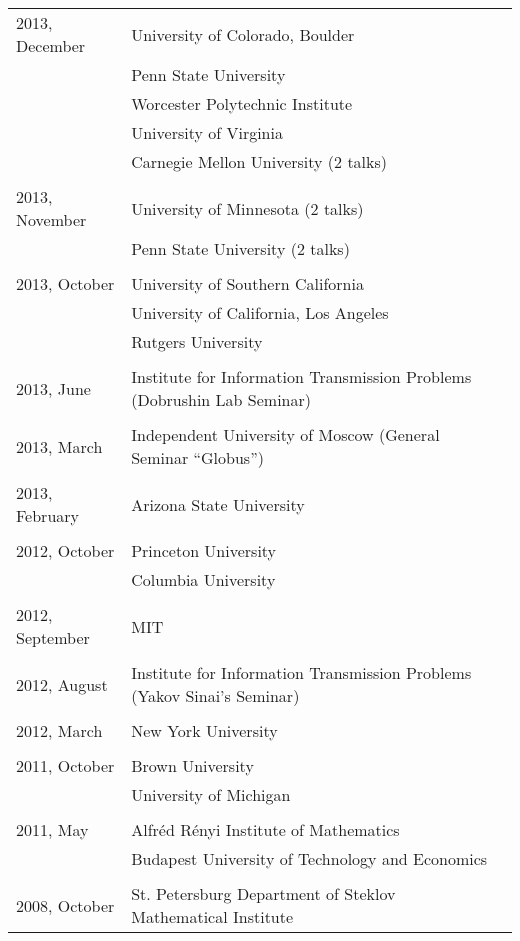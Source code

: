 \documentclass[letterpaper,11pt]{article}
\begin{document}
\begin{longtable}{llc}
  2013, December
  & University of Colorado, Boulder
  \\&Penn State University\\&Worcester Polytechnic Institute
  \\&University of Virginia\\&
  Carnegie Mellon University (2 talks)\\\\
  
  2013, November&
  University of Minnesota (2 talks)\\&
  Penn State University (2 talks)\\\\

  2013, October&
  University of Southern California 
  \\&
  University of California, Los Angeles
  \\&Rutgers University\\\\
  
  2013, June& Institute for Information Transmission Problems
  (Dobrushin Lab Seminar)\\\\

  2013, March& Independent University of Moscow (General Seminar ``Globus'')\\\\

  2013, February & Arizona State University\\\\

  2012, October & Princeton University \\
  & Columbia University\\\\

  2012, September & MIT \\\\ 

  2012, August
  & Institute for Information Transmission Problems
  (Yakov Sinai's Seminar)
  \\\\ 

  2012, March & New York University\\\\

  2011, October & Brown University \\
  &University of Michigan
  \\
  \\
  2011, May& Alfr\'ed R\'enyi Institute of Mathematics
  \\
  & Budapest University of Technology and Economics
  \\\\

  2008, October & 
  St. Petersburg Department of Steklov Mathematical Institute%
  \\
\end{longtable}
\bigskip
\end{document}
